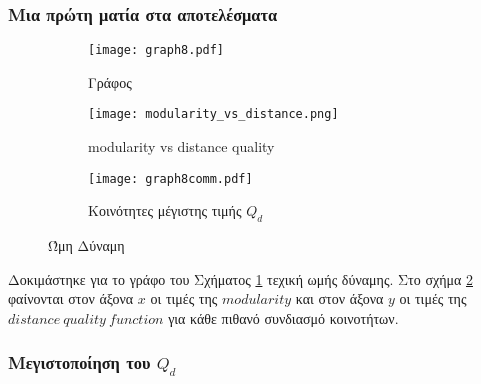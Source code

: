 \documentclass[12pt, letterpaper]{article}
\begin{document}
\subsubsection{Μια πρώτη ματία στα αποτελέσματα}

\begin{figure}[h!]
    \centering
    \begin{subfigure}{0.3\textwidth}
      \centering
      \texttt{[image: graph8.pdf]}
      \caption{Γράφος}
      \label{fig:graph8}
    \end{subfigure}%
    \begin{subfigure}{0.3\textwidth}
      \centering
      \texttt{[image: modularity\_vs\_distance.png]}
      \caption{\textlatin{modularity vs distance quality}}
      \label{fig:mod_dist}
    \end{subfigure}
    \begin{subfigure}{0.3\textwidth}
        \centering
        \texttt{[image: graph8comm.pdf]}
        \caption{Κοινότητες μέγιστης τιμής $Q_d$}
        \label{fig:graph8comm}
      \end{subfigure}%
    \caption{Ώμη Δύναμη }
    \label{fig:brute_force}

\end{figure}




Δοκιμάστηκε για το γράφο του Σχήματος \ref{fig:graph8} τεχική ωμής 
δύναμης. Στο σχήμα \ref{fig:mod_dist} φαίνονται στον άξονα $x$ οι τιμές της 
$modularity$ και στον άξονα $y$ οι τιμές της $distance \ quality \ function$ για 
κάθε πιθανό συνδιασμό κοινοτήτων.














\subsubsection{Μεγιστοποίηση του $Q_d$}
\end{document}
